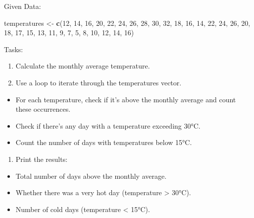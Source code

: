 \documentclass[
]{book}
\newenvironment{Shaded}{\begin{snugshade}}{\end{snugshade}}
\newcommand{\DecValTok}[1]{\textcolor[rgb]{0.00,0.00,0.81}{#1}}
\newcommand{\FunctionTok}[1]{\textcolor[rgb]{0.13,0.29,0.53}{\textbf{#1}}}
\newcommand{\NormalTok}[1]{#1}
\newcommand{\OtherTok}[1]{\textcolor[rgb]{0.56,0.35,0.01}{#1}}
\providecommand{\tightlist}{%
  \setlength{\itemsep}{0pt}\setlength{\parskip}{0pt}}
\begin{document}
Given Data:

\begin{Shaded}
\begin{Highlighting}[]
\NormalTok{temperatures }\OtherTok{\textless{}{-}} \FunctionTok{c}\NormalTok{(}\DecValTok{12}\NormalTok{, }\DecValTok{14}\NormalTok{, }\DecValTok{16}\NormalTok{, }\DecValTok{20}\NormalTok{, }\DecValTok{22}\NormalTok{, }\DecValTok{24}\NormalTok{, }\DecValTok{26}\NormalTok{, }\DecValTok{28}\NormalTok{, }\DecValTok{30}\NormalTok{, }\DecValTok{32}\NormalTok{, }\DecValTok{18}\NormalTok{, }\DecValTok{16}\NormalTok{, }\DecValTok{14}\NormalTok{, }\DecValTok{22}\NormalTok{, }\DecValTok{24}\NormalTok{, }\DecValTok{26}\NormalTok{, }\DecValTok{20}\NormalTok{, }\DecValTok{18}\NormalTok{, }\DecValTok{17}\NormalTok{, }\DecValTok{15}\NormalTok{, }\DecValTok{13}\NormalTok{, }\DecValTok{11}\NormalTok{, }\DecValTok{9}\NormalTok{, }\DecValTok{7}\NormalTok{, }\DecValTok{5}\NormalTok{, }\DecValTok{8}\NormalTok{, }\DecValTok{10}\NormalTok{, }\DecValTok{12}\NormalTok{, }\DecValTok{14}\NormalTok{, }\DecValTok{16}\NormalTok{)}
\end{Highlighting}
\end{Shaded}

Tasks:

\begin{enumerate}
\def\labelenumi{\arabic{enumi}.}
\item
  Calculate the monthly average temperature.
\item
  Use a loop to iterate through the temperatures vector.
\end{enumerate}

\begin{itemize}
\item
  For each temperature, check if it's above the monthly average and count these occurrences.
\item
  Check if there's any day with a temperature exceeding 30°C.
\item
  Count the number of days with temperatures below 15°C.
\end{itemize}

\begin{enumerate}
\def\labelenumi{\arabic{enumi}.}
\setcounter{enumi}{2}
\tightlist
\item
  Print the results:
\end{enumerate}

\begin{itemize}
\item
  Total number of days above the monthly average.
\item
  Whether there was a very hot day (temperature \textgreater{} 30°C).
\item
  Number of cold days (temperature \textless{} 15°C).
\end{itemize}
\end{document}
